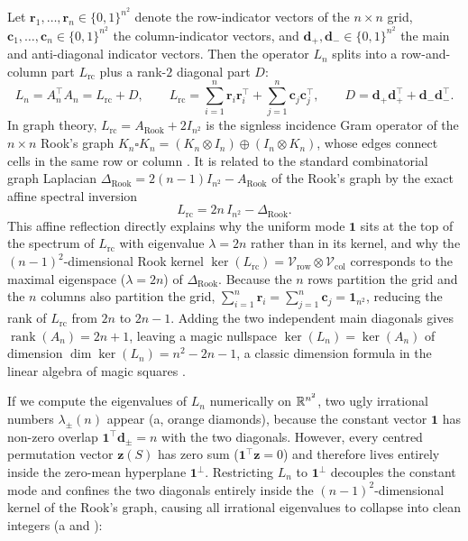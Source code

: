 Let $\mathbf{r}_1,\dots,\mathbf{r}_n \in \{0,1\}^{n^2}$ denote the row-indicator vectors of the $n\times n$ grid, $\mathbf{c}_1,\dots,\mathbf{c}_n \in \{0,1\}^{n^2}$ the column-indicator vectors, and $\mathbf{d}_+, \mathbf{d}_- \in \{0,1\}^{n^2}$ the main and anti-diagonal indicator vectors. Then the operator $L_n$ splits into a row-and-column part $L_{\mathrm{rc}}$ plus a rank-$2$ diagonal part $D$:
\begin{equation}
  L_n = A_n^\top A_n = L_{\mathrm{rc}} + D, \qquad
  L_{\mathrm{rc}} = \sum_{i=1}^n \mathbf{r}_i \mathbf{r}_i^\top + \sum_{j=1}^n \mathbf{c}_j \mathbf{c}_j^\top, \qquad
  D = \mathbf{d}_+ \mathbf{d}_+^\top + \mathbf{d}_- \mathbf{d}_-^\top.
  \label{eq:L_n_outer_sum}
\end{equation}
In graph theory, $L_{\mathrm{rc}} = A_{\mathrm{Rook}} + 2I_{n^2}$ is the signless incidence Gram operator of the $n\times n$ Rook's graph $K_n \square K_n = (K_n \otimes I_n) \oplus (I_n \otimes K_n)$, whose edges connect cells in the same row or column \cite{godsil2001algebraic,brouwer2012spectra}. It is related to the standard combinatorial graph Laplacian $\Delta_{\mathrm{Rook}} = 2(n-1)I_{n^2} - A_{\mathrm{Rook}}$ of the Rook's graph by the exact affine spectral inversion
\begin{equation}
  L_{\mathrm{rc}} = 2n\,I_{n^2} - \Delta_{\mathrm{Rook}}.
  \label{eq:L_rc_rook_inversion}
\end{equation}
This affine reflection directly explains why the uniform mode $\mathbf{1}$ sits at the top of the spectrum of $L_{\mathrm{rc}}$ with eigenvalue $\lambda = 2n$ rather than in its kernel, and why the $(n-1)^2$-dimensional Rook kernel $\ker(L_{\mathrm{rc}}) = \mathcal{V}_{\mathrm{row}}\otimes\mathcal{V}_{\mathrm{col}}$ corresponds to the maximal eigenspace ($\lambda = 2n$) of $\Delta_{\mathrm{Rook}}$. Because the $n$ rows partition the grid and the $n$ columns also partition the grid, $\sum_{i=1}^n \mathbf{r}_i = \sum_{j=1}^n \mathbf{c}_j = \mathbf{1}_{n^2}$, reducing the rank of $L_{\mathrm{rc}}$ from $2n$ to $2n-1$. Adding the two independent main diagonals gives $\operatorname{rank}(A_n) = 2n+1$, leaving a magic nullspace $\ker(L_n) = \ker(A_n)$ of dimension $\dim\ker(L_n) = n^2 - 2n - 1$, a classic dimension formula in the linear algebra of magic squares \cite{ward1980vector,lee1996linear,loly2009magic}.

If we compute the eigenvalues of $L_n$ numerically on $\mathbb{R}^{n^2}$, two ugly irrational numbers $\lambda_\pm(n)$ appear (a, orange diamonds), because the constant vector $\mathbf{1}$ has non-zero overlap $\mathbf{1}^\top \mathbf{d}_\pm = n$ with the two diagonals. However, every centred permutation vector $\mathbf{z}(S)$ has zero sum ($\mathbf{1}^\top\mathbf{z} = 0$) and therefore lives entirely inside the zero-mean hyperplane $\mathbf{1}^\perp$. Restricting $L_n$ to $\mathbf{1}^\perp$ decouples the constant mode and confines the two diagonals entirely inside the $(n-1)^2$-dimensional kernel of the Rook's graph, causing all irrational eigenvalues to collapse into clean integers (a and ):

